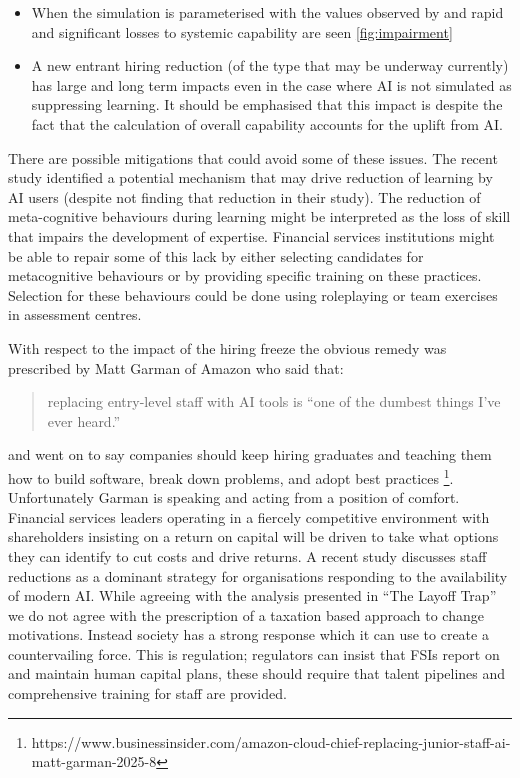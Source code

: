 \documentclass[11pt]{article}
\begin{document}
\begin{itemize}
  \item When the simulation is parameterised with the values observed by \cite{david_stromberg_generative_2026} and \cite{fabrizio_dellacqua_navigating_nodate} rapid and significant losses to systemic capability are seen \ref{fig:impairment} 
  \item A new entrant hiring reduction (of the type that may be underway currently) has large and long term impacts even in the case where AI is not simulated as suppressing learning. It should be emphasised that this impact is despite the fact that the calculation of overall capability accounts for the uplift from AI. 
\end{itemize}
There are possible mitigations that could avoid some of these issues. The recent study \cite{fan_beware_2025} identified a potential mechanism that may drive reduction of learning by AI users (despite not finding that reduction in their study). The reduction of meta-cognitive behaviours during learning might be interpreted as the loss of skill that impairs the development of expertise. Financial services institutions might be able to repair some of this lack by either selecting candidates for metacognitive behaviours or by providing specific training on these practices. Selection for these behaviours could be done using roleplaying or team exercises in assessment centres. 

With respect to the impact of the hiring freeze the obvious remedy was prescribed by Matt Garman of Amazon who said that: \begin{quotation}
replacing entry-level staff with AI tools is ``one of the dumbest things I've ever heard.''
\end{quotation} and went on to say companies should keep hiring graduates and teaching them how to build software, break down problems, and adopt best practices \footnote{https://www.businessinsider.com/amazon-cloud-chief-replacing-junior-staff-ai-matt-garman-2025-8}. Unfortunately Garman is speaking and acting from a position of comfort. Financial services leaders operating in a fiercely competitive environment with shareholders insisting on a return on capital will be driven to take what options they can identify to cut costs and drive returns. A recent study \cite{falk_ai_2026} discusses staff reductions as a dominant strategy for organisations responding to the availability of modern AI. While agreeing with the analysis presented in ``The Layoff Trap'' we do not agree with the prescription of a taxation based approach to change motivations. Instead society has a strong response which it can use to create a countervailing force. This is regulation; regulators can insist that FSIs report on and maintain human capital plans, these should require that talent pipelines and comprehensive training for staff are provided. 
\end{document}
